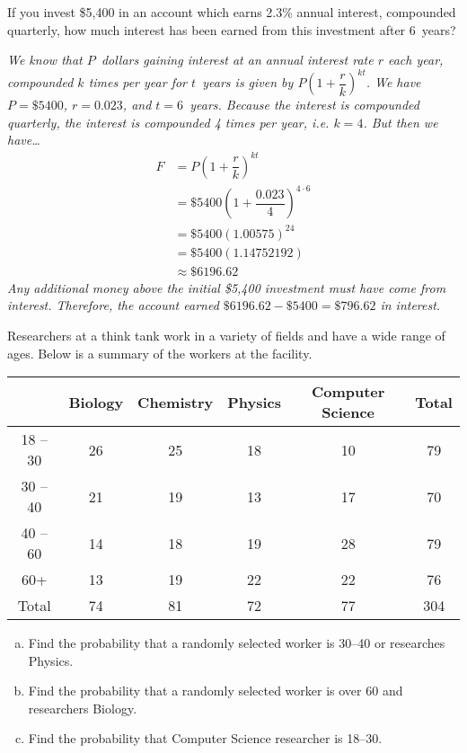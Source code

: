 \documentclass[12pt,letterpaper]{exam}
\begin{document}
\begin{questions}
\newpage
\question[10] If you invest \$5,400 in an account which earns 2.3\% annual interest, compounded quarterly, how much interest has been earned from this investment after 6~years? \pspace

{\itshape
We know that $P$~dollars gaining interest at an annual interest rate $r$ each year, compounded $k$ times per year for $t$~years is given by $P \left(1 + \dfrac{r}{k} \right)^{kt}$. We have $P= \$5400$, $r= 0.023$, and $t= 6$~years. Because the interest is compounded quarterly, the interest is compounded 4 times per year, i.e. $k= 4$. But then we have\dots
	\[
	\begin{aligned}
	F&= P \left(1 + \dfrac{r}{k} \right)^{kt} \\[0.3cm]
	&= \$5400 \left(1 + \dfrac{0.023}{4} \right)^{4 \cdot 6} \\[0.3cm]
	&= \$5400 (1.00575)^{24} \\[0.3cm]
	&= \$5400 (1.14752192) \\[0.3cm]
	&\approx \$6196.62
	\end{aligned}
	\]
Any additional money above the initial \$5,400 investment must have come from interest. Therefore, the account earned $\$6196.62 - \$5400= \$796.62$ in interest. 
}



\newpage
\question[10] Researchers at a think tank work in a variety of fields and have a wide range of ages. Below is a summary of the workers at the facility. \par
	\begin{table}[!ht]
	\centering
	\begin{tabular}{|c||c|c|c|c||c|} \hline
	& Biology & Chemistry & Physics & Computer Science & Total \\ \hline
	18 -- 30 & 26 & 25 & 18 & 10 & 79 \\ \hline
	30 -- 40 & 21 & 19 & 13 & 17 & 70 \\ \hline 
	40 -- 60 & 14 & 18 & 19 & 28 & 79 \\ \hline
	60+ & 13 & 19 & 22 & 22 & 76 \\ \hline \hline
	Total & 74 & 81 & 72 & 77 & 304 \\ \hline
	\end{tabular}
	\end{table} \par

\begin{enumerate}[(a)]
\item Find the probability that a randomly selected worker is 30--40 or researches Physics.
\item Find the probability that a randomly selected worker is over 60 and researchers Biology.
\item Find the probability that Computer Science researcher is 18--30. 
\end{enumerate} \pspace


\end{questions}
\end{document}
